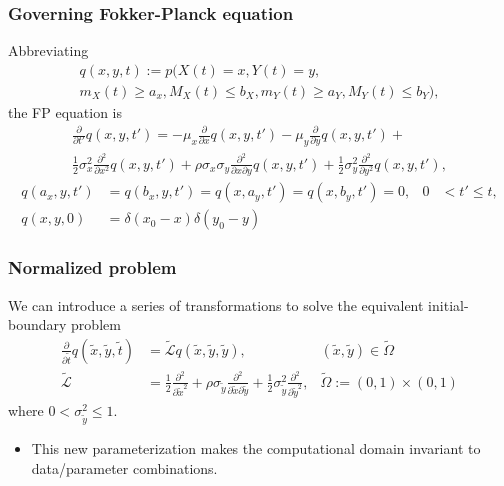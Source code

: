 \documentclass{beamer}
\begin{document}
\begin{frame}
  \frametitle{Governing Fokker-Planck equation}
  Abbreviating 
  \begin{multline*}
    q(x,y,t) := p(X(t) = x, Y(t) = y, \\
    m_X(t) \geq a_x, M_X(t) \leq b_X, m_Y(t) \geq
    a_Y, M_Y(t) \leq b_Y),
  \end{multline*}
  the FP equation is
  \begin{multline*}
    \displaystyle \frac{\partial}{\partial t'} q(x,y,t') = -\mu_x \frac{\partial}{\partial x}q(x,y,t')
    - \mu_y \frac{\partial}{\partial y}q(x,y,t') + \\
    \frac{1}{2}\sigma_x^2 \frac{\partial^2}{\partial x^2}q(x,y,t') + \rho\sigma_x\sigma_y \frac{\partial^2}{\partial x \partial y}q(x,y,t')
    + \frac{1}{2}\sigma_y^2 \frac{\partial^2}{\partial y^2}q(x,y,t'),
  \end{multline*}
  \begin{align*}
    q(a_x, y,t') &= q(b_x,y,t') = q(x,a_y,t') = q(x,b_y,t') = 0, & 0 &< t' \leq t, \\
    q(x,y,0) &= \delta(x_0 - x)\delta(y_0 - y)
  \end{align*}

\end{frame}
\begin{frame}
  \frametitle{Normalized problem}
  We can introduce a series of transformations to solve the equivalent initial-boundary problem
  \begin{align*}
    \frac{\partial}{\partial \tilde{t}} q(\tilde{x},\tilde{y},\tilde{t}) &= \tilde{\mathcal{L}} q(\tilde{x},\tilde{y},\tilde{y}), & (\tilde{x}, \tilde{y}) \in \tilde{\Omega} \\
    \tilde{\mathcal{L}} &= \frac{1}{2} \frac{\partial^2}{\partial \tilde{x}^2} + \rho \sigma_{\tilde{y}} \frac{\partial^2}{\partial \tilde{x} \partial \tilde{y}} + \frac{1}{2} \sigma^2_{\tilde{y}} \frac{\partial^2}{\partial \tilde{y}^2},& \tilde{\Omega} := (0,1) \times (0,1)
  \end{align*}
  where $0 < \sigma_{\tilde{y}}^2 \leq 1$.

  \begin{itemize}
  \item This new parameterization makes the computational domain invariant
  to data/parameter combinations.
  \end{itemize}
\end{frame}
\end{document}
